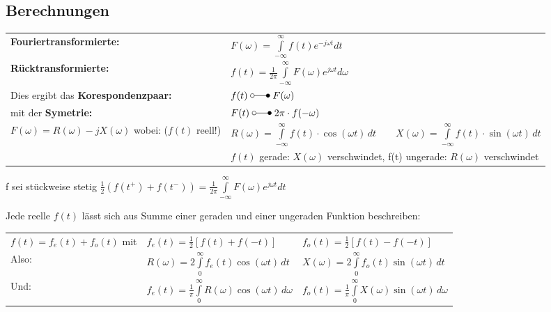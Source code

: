 	\subsection{Berechnungen}%
		\vspace{-2mm}	%
		\begin{tabular}{|p{6cm} l|} \hline
			\textbf{Fouriertransformierte:} &
			$F(\omega) = \int\limits_{-\infty}^{\infty} f(t)e^{-j\omega t}dt$ \\
			\textbf{Rücktransformierte:} &
			$f(t) = \frac{1}{2\pi}\int\limits_{-\infty}^{\infty}F(\omega)e^{j\omega t}d\omega$ \\ \hline
		
		Dies ergibt das \textbf{Korespondenzpaar:} & $f(t) \; \laplace \; F(\omega)$ \\
		mit der \textbf{Symetrie:} & $F(t) \; \laplace \; 2\pi \cdot f(-\omega)$ \\
		
		$F(\omega) = R(\omega) -jX(\omega)$ wobei: ($f(t)$ reell!) &
		$R(\omega) = \int\limits_{-\infty}^\infty f(t)\cdot \cos(\omega t)\,dt \quad\quad X(\omega) =
		\int\limits_{-\infty}^\infty f(t)\cdot \sin(\omega t)\,dt$
		\\
		&$f(t)$ gerade: $X(\omega)$ verschwindet, f(t) ungerade: $R(\omega)$ verschwindet \\
		\hline
		\end{tabular}
		
		f sei stückweise stetig $\frac{1}{2}(f(t^+) + f(t^-)) = \frac{1}{2\pi} \int\limits_{-\infty}^{\infty}F(\omega)e^{j\omega t} dt$
		
		Jede reelle $f(t)$ lässt sich aus Summe einer geraden und einer ungeraden Funktion beschreiben:\\[3mm]
		\begin{tabular}{lll}
			$f(t) = f_e(t) + f_o(t)$ mit & $f_e(t) = \frac{1}{2}[f(t) + f(-t)]$ & $f_o(t) = \frac{1}{2}[f(t) - f(-t)]$ \\[3mm]
			
			Also: & $R(\omega) = 2 \int\limits_0^\infty f_e(t) \cos(\omega t)\,dt$ & $X(\omega) = 2 \int\limits_0^\infty
			f_o(t) \sin(\omega t)\,dt$ \\[3mm]
			
			Und: & $f_e(t) = \frac{1}{\pi}\int\limits_0^\infty R(\omega)\cos(\omega t)\,d\omega$ & 
			$f_o(t) = \frac{1}{\pi}\int\limits_0^\infty X(\omega)\sin(\omega t)\,d\omega$ \\[3mm]
		\end{tabular}
		
